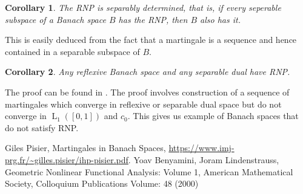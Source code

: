 \documentclass[]{report}
\newcommand{\lp}[2]{\operatorname{L}_{#1}({#2})}
\newtheorem{corollary}{Corollary}[theorem]
\begin{document}
\begin{corollary}
	The RNP is separably determined, that is, if every seperable subspace of a Banach space $B$ has the RNP, then $B$ also has it.
\end{corollary}
This is easily deduced from the fact that a martingale is a sequence and hence contained in a separable subspace of $B$.

\begin{corollary}
	Any reflexive Banach space and any separable dual have RNP.
\end{corollary}
The proof can be found in \cite{pis}. The proof involves construction of a sequence of martingales which converge in reflexive or separable dual space but do not converge in $\lp{1}{[0,1]}$ and $c_0$. This gives us example of Banach spaces that do not satisfy RNP.



\begin{thebibliography}{9}
	Giles Pisier, Martingales in Banach Spaces, \url{https://www.imj-prg.fr/~gilles.pisier/ihp-pisier.pdf}.
	Yoav Benyamini, 
	Joram Lindenstrauss, Geometric Nonlinear Functional Analysis: Volume 1, American Mathematical Society, Colloquium Publications
	Volume: 48 (2000)
\end{thebibliography}
\end{document}
